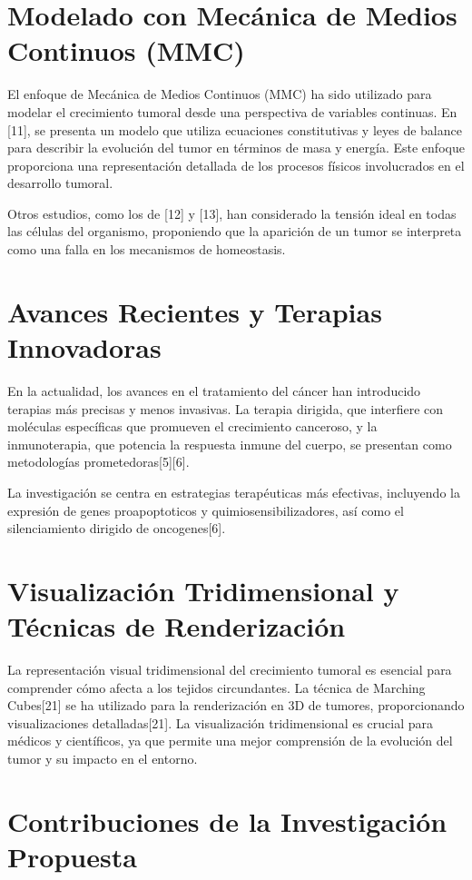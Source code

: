 \section{Modelado con Mecánica de Medios Continuos (MMC)}

El enfoque de Mecánica de Medios Continuos (MMC) ha sido utilizado para modelar el crecimiento tumoral desde una perspectiva de variables continuas. En [11], se presenta un modelo que utiliza ecuaciones constitutivas y leyes de balance para describir la evolución del tumor en términos de masa y energía. Este enfoque proporciona una representación detallada de los procesos físicos involucrados en el desarrollo tumoral.

Otros estudios, como los de [12] y [13], han considerado la tensión ideal en todas las células del organismo, proponiendo que la aparición de un tumor se interpreta como una falla en los mecanismos de homeostasis.

\section{Avances Recientes y Terapias Innovadoras}

En la actualidad, los avances en el tratamiento del cáncer han introducido terapias más precisas y menos invasivas. La terapia dirigida, que interfiere con moléculas específicas que promueven el crecimiento canceroso, y la inmunoterapia, que potencia la respuesta inmune del cuerpo, se presentan como metodologías prometedoras[5][6].

La investigación se centra en estrategias terapéuticas más efectivas, incluyendo la expresión de genes proapoptoticos y quimiosensibilizadores, así como el silenciamiento dirigido de oncogenes[6].

\section{Visualización Tridimensional y Técnicas de Renderización}

La representación visual tridimensional del crecimiento tumoral es esencial para comprender cómo afecta a los tejidos circundantes. La técnica de Marching Cubes[21] se ha utilizado para la renderización en 3D de tumores, proporcionando visualizaciones detalladas[21]. La visualización tridimensional es crucial para médicos y científicos, ya que permite una mejor comprensión de la evolución del tumor y su impacto en el entorno.

\section{Contribuciones de la Investigación Propuesta}

